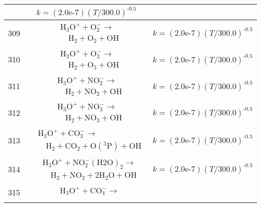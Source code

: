 \begin{longtable}{| m{} | m{}| m{} |}
$$\begin{aligned}
\end{aligned}
$$ & $$k = (\textrm{2.0e-7})(T/\textrm{300.0})^{\textrm{-0.5}} $$ \\
\hline
 309 & $$
\begin{aligned}
&\mathrm{H_3O^+} + \mathrm{O_2^-} \longrightarrow \\
&\quad \mathrm{H_2} + \mathrm{O_2} + \mathrm{OH}
\end{aligned}
$$ & $$k = (\textrm{2.0e-7})(T/\textrm{300.0})^{\textrm{-0.5}} $$ \\
\hline
 310 & $$
\begin{aligned}
&\mathrm{H_3O^+} + \mathrm{O_3^-} \longrightarrow \\
&\quad \mathrm{H_2} + \mathrm{O_3} + \mathrm{OH}
\end{aligned}
$$ & $$k = (\textrm{2.0e-7})(T/\textrm{300.0})^{\textrm{-0.5}} $$ \\
\hline
 311 & $$
\begin{aligned}
&\mathrm{H_3O^+} + \mathrm{NO_2^-} \longrightarrow \\
&\quad \mathrm{H_2} + \mathrm{NO_2} + \mathrm{OH}
\end{aligned}
$$ & $$k = (\textrm{2.0e-7})(T/\textrm{300.0})^{\textrm{-0.5}} $$ \\
\hline
 312 & $$
\begin{aligned}
&\mathrm{H_3O^+} + \mathrm{NO_3^-} \longrightarrow \\
&\quad \mathrm{H_2} + \mathrm{NO_3} + \mathrm{OH}
\end{aligned}
$$ & $$k = (\textrm{2.0e-7})(T/\textrm{300.0})^{\textrm{-0.5}} $$ \\
\hline
 313 & $$
\begin{aligned}
&\mathrm{H_3O^+} + \mathrm{CO_3^-} \longrightarrow \\
&\quad \mathrm{H_2} + \mathrm{CO_2} + \mathrm{O(^3P)} + \mathrm{OH}
\end{aligned}
$$ & $$k = (\textrm{2.0e-7})(T/\textrm{300.0})^{\textrm{-0.5}} $$ \\
\hline
 314 & $$
\begin{aligned}
&\mathrm{H_3O^+} + \mathrm{NO_2^-(H2O)_2} \longrightarrow \\
&\quad \mathrm{H_2} + \mathrm{NO_2} + 2\mathrm{H_2O} + \mathrm{OH}
\end{aligned}
$$ & $$k = (\textrm{2.0e-7})(T/\textrm{300.0})^{\textrm{-0.5}} $$ \\
\hline
 315 & $$
\begin{aligned}
&\mathrm{H_3O^+} + \mathrm{CO_4^-} \longrightarrow \\

\end{aligned}$$
\end{longtable}

